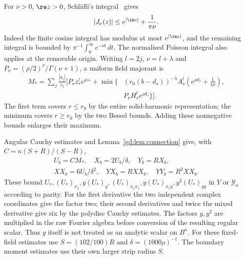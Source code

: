 For $\nu>0$, $\re z>0$, Schl\"afli's integral~\cite[10.9.6]{DLMF} gives
\[
 |J_\nu(z)|\le e^{|\im z|}+\frac1{\pi\nu}.
\]
Indeed the finite cosine integral has modulus at most $e^{|\im z|}$,
and the remaining integral is bounded by
$\pi^{-1}\int_0^\infty e^{-\nu t}\,dt$.
The normalised Poisson integral also applies at the removable origin.
Writing $l=2j$, $\nu=l+\lambda$ and
$P_\nu=(\rho/2)^\nu/\Gamma(\nu+1)$, a uniform field majorant is
\begin{equation}\label{gd:eq:Mfield}
 \begin{split}
 M_*=\sum_j\frac{|a_j|}{s_j}\biggl[
 P_\nu z_*^l e^{\rho z_*}
 +\min\biggl\{&
 (r_0(b-d_s))^{-\lambda}A_s^l
                 \left(e^{\rho d_s}+\frac1{\pi\nu}\right),\\[-2pt]
 &P_\nu H_s^l e^{\rho d_s}\biggr\}\biggr].
 \end{split}
\end{equation}
The first term covers $r\le r_0$ by the entire solid-harmonic
representation; the minimum covers $r\ge r_0$ by the two Bessel bounds.
Adding these nonnegative bounds enlarges their maximum.

Angular Cauchy estimates and Lemma~\ref{gd:lem:connection} give, with
$C=\kappa(S+R)/(S-R)$,
\begin{equation}\label{gd:eq:fixed-field-bounds}
 \begin{gathered}
 U_b=CM_*,\quad X_b=2U_b/\delta,\quad Y_b=RX_b,\\
 XX_b=6U_b/\delta^2,\quad YX_b=RXX_b,\quad YY_b=R^2XX_b .
 \end{gathered}
\end{equation}
These bound $U_*,(U_*)_{x_1},y(U_*)_y,(U_*)_{x_1x_1},
y(U_*)_{x_1y},y^2(U_*)_{yy}$ in $Y$ or $\mathcal Y_n$
according to parity.
For the first derivative the two independent complex coordinates give
the factor two; their second derivatives and twice the mixed derivative
give six by the polydisc Cauchy estimates.
The factors $y,y^2$ are multiplied in the raw Fourier algebra before
conversion of the resulting regular scalar. Thus $y$ itself is not
treated as an analytic scalar on $B^n$.
For these fixed-field estimates use $S=(102/100)R$ and
$\delta=(1000\rho)^{-1}$.
The boundary moment estimates use their own larger strip radius $S$.

